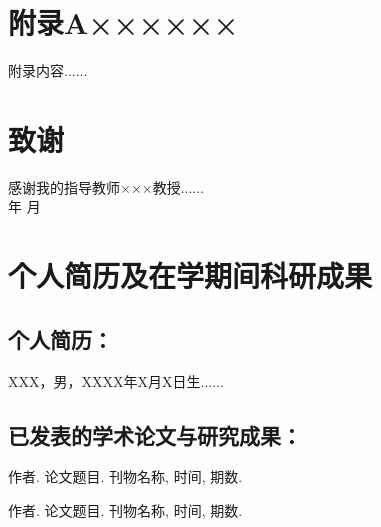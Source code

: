 \documentclass[UTF8,a4paper,boldfont]{ctexart}
\begin{document}
\newpage
\printbibliography[heading=bibintoc, title=参考文献] %

\newpage
\section*{附\quad 录A\quad ××××××}
附录内容......

\newpage
\section*{致\quad 谢}
感谢我的指导教师×××教授......\\[2cm]

\hfill 年 \quad 月

\newpage
\section*{个人简历及在学期间科研成果}
\subsection*{个人简历：}
\noindent XXX，男，XXXX年X月X日生......

\subsection*{已发表的学术论文与研究成果：}
\noindent [1] 作者. 论文题目. 刊物名称, 时间, 期数.

\noindent [2] 作者. 论文题目. 刊物名称, 时间, 期数. 
\end{document}
